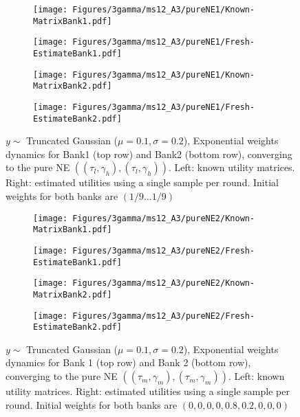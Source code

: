 \begin{figure}[H]
    \centering
    \begin{subfigure}{0.49\linewidth}
        \centering
        \texttt{[image: Figures/3gamma/ms12\_A3/pureNE1/Known-MatrixBank1.pdf]}
    \end{subfigure}
    \begin{subfigure}{0.49\linewidth}
        \centering
        \texttt{[image: Figures/3gamma/ms12\_A3/pureNE1/Fresh-EstimateBank1.pdf]}
    \end{subfigure}

    \begin{subfigure}{0.49\linewidth}
        \centering
        \texttt{[image: Figures/3gamma/ms12\_A3/pureNE1/Known-MatrixBank2.pdf]}
    \end{subfigure}
    \begin{subfigure}{0.49\linewidth}
        \centering
        \texttt{[image: Figures/3gamma/ms12\_A3/pureNE1/Fresh-EstimateBank2.pdf]}
    \end{subfigure}
    \caption{$y \sim$ Truncated Gaussian ($\mu=0.1, \sigma=0.2$), Exponential weights dynamics for Bank1 (top row) and Bank2 (bottom row), converging to the pure NE $((\tau_l, \gamma_h),(\tau_l, \gamma_h))$. Left: known utility matrices. Right: estimated utilities using a single sample per round. Initial weights for both banks are $(1/9 \ldots 1/9)$ \label{fig:dyna-A3-pure1}}

\end{figure}


\begin{figure}[H]
    \centering
    \begin{subfigure}{0.49\linewidth}
        \centering
        \texttt{[image: Figures/3gamma/ms12\_A3/pureNE2/Known-MatrixBank1.pdf]}
    \end{subfigure}
    \begin{subfigure}{0.49\linewidth}
        \centering
        \texttt{[image: Figures/3gamma/ms12\_A3/pureNE2/Fresh-EstimateBank1.pdf]}
    \end{subfigure}

    \begin{subfigure}{0.49\linewidth}
        \centering
        \texttt{[image: Figures/3gamma/ms12\_A3/pureNE2/Known-MatrixBank2.pdf]}
    \end{subfigure}
    \begin{subfigure}{0.49\linewidth}
        \centering
        \texttt{[image: Figures/3gamma/ms12\_A3/pureNE2/Fresh-EstimateBank2.pdf]}
    \end{subfigure}
    \caption{$y \sim$ Truncated Gaussian ($\mu=0.1, \sigma=0.2$), Exponential weights dynamics for Bank 1 (top row) and Bank 2 (bottom row), converging to the pure NE $((\tau_m, \gamma_m),(\tau_m, \gamma_m))$. Left: known utility matrices. Right: estimated utilities using a single sample per round. Initial weights for both banks are $(0,0,0, 0,0.8,0.2, 0,0,0)$ \label{fig:dyna-A3-pure2}}
\end{figure}

